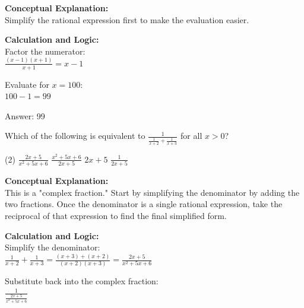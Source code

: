 \documentclass[11pt,paper=a4,answers]{exam}
\begin{document}
\begin{questions}
\begin{solution}
\textbf{Conceptual Explanation:} \\
Simplify the rational expression first to make the evaluation easier.

\vspace{20pt}

\textbf{Calculation and Logic:} \\
Factor the numerator: \\
$\frac{(x-1)(x+1)}{x+1} = x - 1$

\vspace{10pt}

Evaluate for $x = 100$: \\
$100 - 1 = 99$

\vspace{25pt}

Answer: \colorbox{yellow!100}{99}
\end{solution}


\question
Which of the following is equivalent to $\frac{1}{\frac{1}{x+2} + \frac{1}{x+3}}$ for all $x > 0$?
\begin{tasks}(2)
    \task $\frac{2x+5}{x^2+5x+6}$
    \task $\frac{x^2+5x+6}{2x+5}$
    \task $2x+5$
    \task $\frac{1}{2x+5}$
\end{tasks}

\begin{solution}
\textbf{Conceptual Explanation:} \\
This is a "complex fraction." Start by simplifying the denominator by adding the two fractions. Once the denominator is a single rational expression, take the reciprocal of that expression to find the final simplified form.

\vspace{20pt}

\textbf{Calculation and Logic:} \\
Simplify the denominator: \\
$\frac{1}{x+2} + \frac{1}{x+3} = \frac{(x+3) + (x+2)}{(x+2)(x+3)} = \frac{2x+5}{x^2+5x+6}$

\vspace{10pt}

Substitute back into the complex fraction: \\
$\frac{1}{\frac{2x+5}{x^2+5x+6}}$

\vspace{10pt}


\end{solution}
\end{questions}
\end{document}
